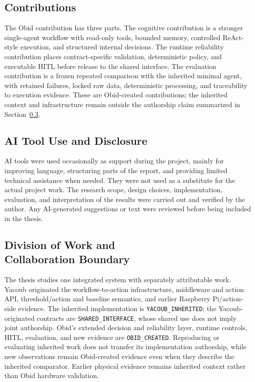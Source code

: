 \subsection{Contributions}\label{subsec:intro-contributions}

The Obid contribution has three parts. The cognitive contribution is a stronger
single-agent workflow with read-only tools, bounded memory, controlled
ReAct-style execution, and structured internal decisions. The runtime
reliability contribution places contract-specific validation, deterministic
policy, and executable HITL before release to the shared interface. The
evaluation contribution is a frozen repeated comparison with the inherited
minimal agent, with retained failures, locked raw data, deterministic
processing, and traceability to execution evidence. These are Obid-created
contributions; the inherited context and infrastructure remain outside the
authorship claim summarized in Section~\ref{subsec:intro-division}.

\subsection{AI Tool Use and Disclosure}\label{subsec:intro-ai-disclosure}

AI tools were used occasionally as support during the project, mainly for
improving language, structuring parts of the report, and providing limited
technical assistance when needed. They were not used as a substitute for the
actual project work. The research scope, design choices, implementation,
evaluation, and interpretation of the results were carried out and verified by
the author. Any AI-generated suggestions or text were reviewed before being
included in the thesis.

\subsection[Division of Work and Collaboration Boundary]{Division of Work and\\Collaboration Boundary}\label{subsec:intro-division}

The thesis studies one integrated system with separately attributable work.
Yacoub originated the workflow-to-action infrastructure, middleware and action
API, threshold/action and baseline semantics, and earlier Raspberry
Pi/action-side evidence. The inherited implementation is
\mbox{\texttt{YACOUB\_INHERITED}}; the Yacoub-originated contracts are
\mbox{\texttt{SHARED\_INTERFACE}}, whose shared use does not imply joint
authorship. Obid's extended decision and reliability layer, runtime controls,
HITL, evaluation, and new evidence are \mbox{\texttt{OBID\_CREATED}}.
Reproducing or evaluating inherited work does not transfer its implementation
authorship, while new observations remain Obid-created evidence even when they
describe the inherited comparator. Earlier physical evidence remains inherited
context rather than Obid hardware validation.

